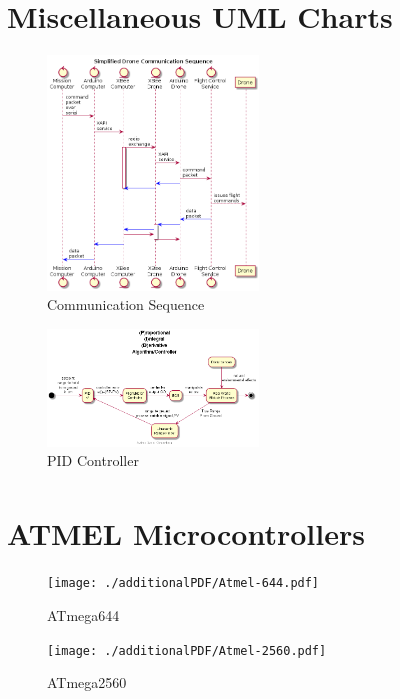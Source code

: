 \documentclass[pdftex,11pt]{article}
\begin{document}
\clearpage
\appendix
\appendixpage	
\addappheadtotoc

\section{Miscellaneous UML Charts}
\label{sec:appUML}
\begin{figure}[!h]
	\centering
		\includegraphics[width=0.5\textwidth]{./plantUML/droneControlSequence.png}
	\caption{Communication Sequence}
	\label{fig:comseq}
\end{figure}

\begin{figure}[!h]
	\centering
		\includegraphics[width=0.5\textwidth]{./plantUML/PIDloop}
	\caption{PID Controller}
	\label{fig:PIDloop}
\end{figure}

\clearpage
\section{ATMEL\textsuperscript{\textcopyright} Microcontrollers}
\label{sec:appATMEL}
\begin{figure}[!h]
	\centering
		\texttt{[image: ./additionalPDF/Atmel-644.pdf]}
	\caption{ATmega644}
	\label{fig:ATmega644}
\end{figure}

\begin{figure}[!h]
	\centering
		\texttt{[image: ./additionalPDF/Atmel-2560.pdf]}
	\caption{ATmega2560}
	\label{fig:ATmega2560}
\end{figure}
\end{document}
